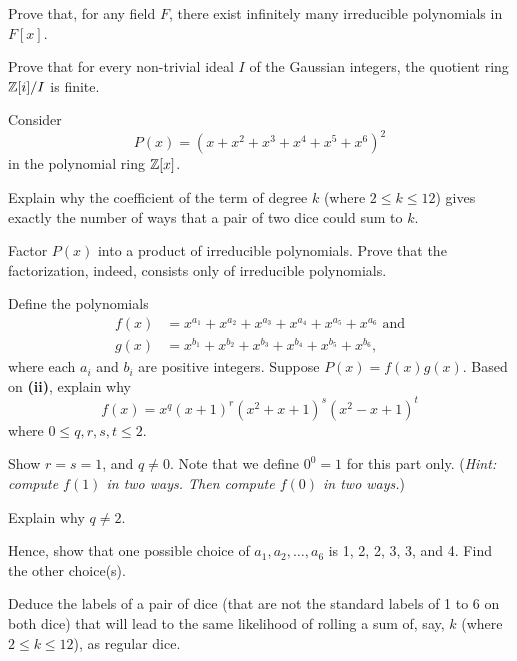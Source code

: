 \begin{problem}
    Prove that, for any field $F$, there exist infinitely many irreducible polynomials in $F[x]$.
\end{problem}

\begin{problem}
    Prove that for every non-trivial ideal $I$ of the Gaussian integers, the quotient ring $\mathbb{Z}[i]/I$ is finite.
\end{problem}

\newpage

\begin{problem}
    Consider
    \[
        P(x) = (x + x^2 + x^3 + x^4 + x^5 + x^6)^2
    \]
    in the polynomial ring $\mathbb{Z}[x]$.
    \begin{partquestions}{\roman*}
        \item Explain why the coefficient of the term of degree $k$ (where $2 \leq k \leq 12$) gives exactly the number of ways that a pair of two dice could sum to $k$.

        \item Factor $P(x)$ into a product of irreducible polynomials. Prove that the factorization, indeed, consists only of irreducible polynomials.

        \item Define the polynomials
        \begin{align*}
            f(x) &= x^{a_1} + x^{a_2} + x^{a_3} + x^{a_4} + x^{a_5} + x^{a_6} \text{ and}\\
            g(x) &= x^{b_1} + x^{b_2} + x^{b_3} + x^{b_4} + x^{b_5} + x^{b_6},
        \end{align*}
        where each $a_i$ and $b_i$ are positive integers. Suppose $P(x) = f(x)g(x)$. Based on \textbf{(ii)}, explain why
        \[
            f(x) = x^q(x+1)^r(x^2+x+1)^s(x^2-x+1)^t
        \]
        where $0 \leq q,r,s,t \leq 2$.

        \item Show $r = s = 1$, and $q \neq 0$. Note that we define $0^0 = 1$ for this part only.\newline
        (\textit{Hint: compute $f(1)$ in two ways. Then compute $f(0)$ in two ways.})

        \item Explain why $q \neq 2$.

        \item Hence, show that one possible choice of $a_1, a_2, \dots, a_6$ is 1, 2, 2, 3, 3, and 4. Find the other choice(s).

        \item Deduce the labels of a pair of dice (that are not the standard labels of 1 to 6 on both dice) that will lead to the same likelihood of rolling a sum of, say, $k$ (where $2 \leq k \leq 12$), as regular dice.
    \end{partquestions}
\end{problem}
